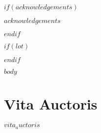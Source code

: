 \documentclass[phdthesis,12pt,final,a4paper]{wuthesis}
\begin{document}
$if(acknowledgements)$
\begin{thesisacknowledgments}
$acknowledgements$
\end{thesisacknowledgments}
$endif$

\begin{singlespace}
  \renewcommand\contentsname{\chapter*{Table of Contents}}
\tableofcontents
\end{singlespace}

$if(lot)$
{}
\begin{center}
\end{center}
\vspace{1em}
\begin{singlespace}
\listoftables
\end{singlespace}
$endif$

\cleardoublepage
\listoffigures


\cleardoublepage
{}
\setcounter{page}{1}

$body$

\backmatter

\cleardoublepage
{}
{}
\chapter*{Vita Auctoris}
\begin{doublespace}
$vita_auctoris$
\end{doublespace}

\end{document}
